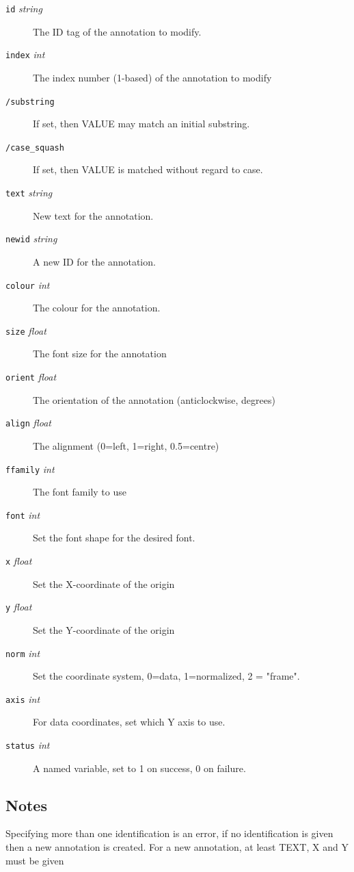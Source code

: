 \documentclass[11pt,twoside,english]{article}
\begin{document}
 \begin{description}
\item[\texttt{id} \textit{string}] The ID tag of the annotation to modify.
\item[\texttt{index} \textit{int}] The index number (1-based) of the annotation
		to modify
\item[\texttt{/substring}] If set, then VALUE may match an initial substring.
\item[\texttt{/case\_squash}] If set, then VALUE is matched without regard
		to case.
\item[\texttt{text} \textit{string}] New text for the annotation.
\item[\texttt{newid} \textit{string}] A new ID for the annotation.
\item[\texttt{colour} \textit{int}] The colour for the annotation.
\item[\texttt{size} \textit{float}] The font size for the annotation
\item[\texttt{orient} \textit{float}] The orientation of the annotation
		(anticlockwise, degrees)
\item[\texttt{align} \textit{float}] The alignment (0=left, 1=right, 0.5=centre)
\item[\texttt{ffamily} \textit{int}] The font family to use 
\item[\texttt{font} \textit{int}] Set the font shape for the desired font.
\item[\texttt{x} \textit{float}] Set the X-coordinate of the origin
\item[\texttt{y} \textit{float}] Set the Y-coordinate of the origin
\item[\texttt{norm} \textit{int}] Set the coordinate system, 0=data,
		1=normalized, 2 = "frame".
\item[\texttt{axis} \textit{int}] For data coordinates, set which Y axis to use.
\item[\texttt{status} \textit{int}] A named variable, set to 1 on success, 0 on
		failure.
\end{description}

\subsection{ Notes}
\label{sec:ga-notes}

	Specifying more than one identification is an error, if no
	identification is given then a new annotation is created.
	For a new annotation, at least TEXT, X and Y must be given
\end{document}
